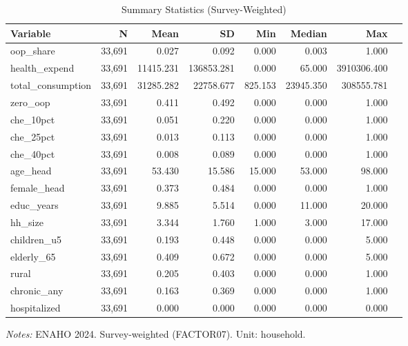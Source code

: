 \begin{table}[htbp]
\centering
\caption{Summary Statistics (Survey-Weighted)}
\label{tab:sumstats}
\small
\begin{tabular}{lrrrrrrr}
\toprule
Variable & N & Mean & SD & Min & Median & Max \\
\midrule
  oop\_share & 33,691 & 0.027 & 0.092 & 0.000 & 0.003 & 1.000 \\
  health\_expend & 33,691 & 11415.231 & 136853.281 & 0.000 & 65.000 & 3910306.400 \\
  total\_consumption & 33,691 & 31285.282 & 22758.677 & 825.153 & 23945.350 & 308555.781 \\
  zero\_oop & 33,691 & 0.411 & 0.492 & 0.000 & 0.000 & 1.000 \\
  che\_10pct & 33,691 & 0.051 & 0.220 & 0.000 & 0.000 & 1.000 \\
  che\_25pct & 33,691 & 0.013 & 0.113 & 0.000 & 0.000 & 1.000 \\
  che\_40pct & 33,691 & 0.008 & 0.089 & 0.000 & 0.000 & 1.000 \\
  age\_head & 33,691 & 53.430 & 15.586 & 15.000 & 53.000 & 98.000 \\
  female\_head & 33,691 & 0.373 & 0.484 & 0.000 & 0.000 & 1.000 \\
  educ\_years & 33,691 & 9.885 & 5.514 & 0.000 & 11.000 & 20.000 \\
  hh\_size & 33,691 & 3.344 & 1.760 & 1.000 & 3.000 & 17.000 \\
  children\_u5 & 33,691 & 0.193 & 0.448 & 0.000 & 0.000 & 5.000 \\
  elderly\_65 & 33,691 & 0.409 & 0.672 & 0.000 & 0.000 & 5.000 \\
  rural & 33,691 & 0.205 & 0.403 & 0.000 & 0.000 & 1.000 \\
  chronic\_any & 33,691 & 0.163 & 0.369 & 0.000 & 0.000 & 1.000 \\
  hospitalized & 33,691 & 0.000 & 0.000 & 0.000 & 0.000 & 0.000 \\
\bottomrule
\end{tabular}
\begin{minipage}{\textwidth}\footnotesize
\textit{Notes:} ENAHO 2024. Survey-weighted (FACTOR07). Unit: household.
\end{minipage}
\end{table}